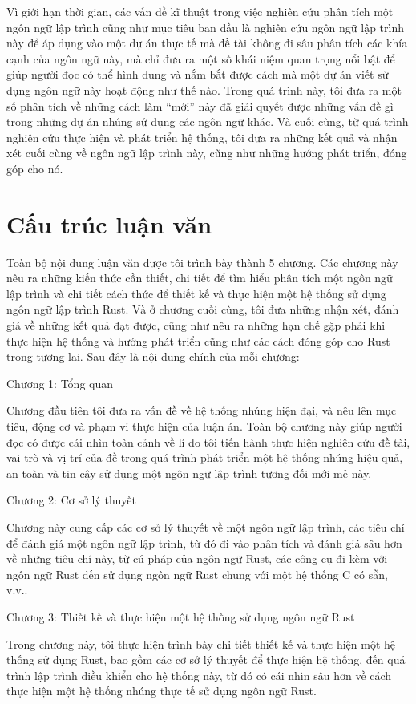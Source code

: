 Vì giới hạn thời gian, các vấn đề kĩ thuật trong việc nghiên cứu phân tích một ngôn ngữ lập trình cũng như mục tiêu ban đầu là nghiên cứu ngôn ngữ lập trình này để áp dụng vào một dự án thực tế mà đề tài không đi sâu phân tích các khía cạnh của ngôn ngữ này, mà chỉ đưa ra một số khái niệm quan trọng nổi bật để giúp người đọc có thể hình dung và nắm bắt được cách mà một dự án viết sử dụng ngôn ngữ này hoạt động như thế nào.
Trong quá trình này, tôi đưa ra một số phân tích về những cách làm ``mới'' này đã giải quyết được những vấn đề gì trong những dự án nhúng sử dụng các ngôn ngữ khác.
Và cuối cùng, từ quá trình nghiên cứu thực hiện và phát triển hệ thống, tôi đưa ra những kết quả và nhận xét cuối cùng về ngôn ngữ lập trình này, cũng như những hướng phát triển, đóng góp cho nó.

\section{Cấu trúc luận văn}
Toàn bộ nội dung luận văn được tôi trình bày thành 5 chương. Các chương này nêu ra những kiến thức cần thiết, chi tiết để tìm hiểu phân tích một ngôn ngữ lập trình và chi tiết cách thức để thiết kế và thực hiện một hệ thống sử dụng ngôn ngữ lập trình Rust. Và ở chương cuối cùng, tôi đưa những nhận xét, đánh giá về những kết quả đạt được, cũng như nêu ra những hạn chế gặp phải khi thực hiện hệ thống và hướng phát triển cũng như các cách đóng góp cho Rust trong tương lai. Sau đây là nội dung chính của mỗi chương:

Chương 1: Tổng quan

Chương đầu tiên tôi đưa ra vấn đề về hệ thống nhúng hiện đại, và nêu lên mục tiêu, động cơ và phạm vi thực hiện của luận án. Toàn bộ chương này giúp người đọc có được cái nhìn toàn cảnh về lí do tôi tiến hành thực hiện nghiên cứu đề tài, vai trò và vị trí của đề trong quá trình phát triển một hệ thống nhúng hiệu quả, an toàn và tin cậy sử dụng một ngôn ngữ lập trình tương đối mới mẻ này.

Chương 2: Cơ sở lý thuyết

Chương này cung cấp các cơ sở lý thuyết về một ngôn ngữ lập trình, các tiêu chí để đánh giá một ngôn ngữ lập trình, từ đó đi vào phân tích và đánh giá sâu hơn về những tiêu chí này, từ cú pháp của ngôn ngữ Rust, các công cụ đi kèm với ngôn ngữ Rust đến sử dụng ngôn ngữ Rust chung với một hệ thống C có sẵn, v.v..

Chương 3: Thiết kế và thực hiện một hệ thống sử dụng ngôn ngữ Rust

Trong chương này, tôi thực hiện trình bày chi tiết thiết kế và thực hiện một hệ thống sử dụng Rust, bao gồm các cơ sở lý thuyết để thực hiện hệ thống, đến quá trình lập trình điều khiển cho hệ thống này, từ đó có cái nhìn sâu hơn về cách thực hiện một hệ thống nhúng thực tế sử dụng ngôn ngữ Rust.

